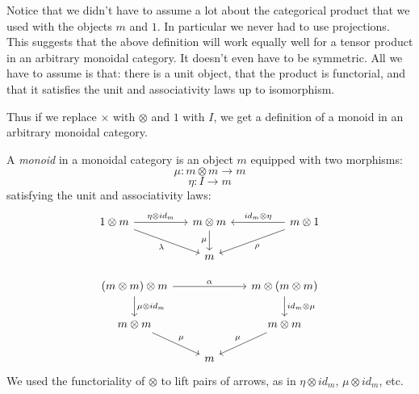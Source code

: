 \documentclass[DaoFP]{subfiles}
\begin{document}
Notice that we didn't have to assume a lot about the categorical product that we used with the objects $m$ and $1$. In particular we never had to use projections. This suggests that the above definition will work equally well for a tensor product in an arbitrary monoidal category. It doesn't even have to be symmetric. All we have to assume is that: there is a unit object, that the product is functorial, and that it satisfies the unit and associativity laws up to isomorphism.

Thus if we replace $\times$ with $\otimes$ and $1$ with $I$, we get a definition of a monoid in an arbitrary monoidal category. 

A \emph{monoid} in a monoidal category is an object $m$ equipped with two morphisms:
\[ \mu \colon m \otimes m \to m \]
\[ \eta \colon I \to m \]
satisfying the unit and associativity laws:
\[
 \begin{tikzcd}
 1 \otimes m
 \arrow[rr, "\eta \otimes id_m"]
 \arrow[rrd, "\lambda"']
& & m \otimes m
 \arrow[d, "\mu"']
&& m \otimes 1
 \arrow[ll, "id_m \otimes \eta"']
 \arrow[lld, "\rho"]
 \\
 && m
  \end{tikzcd}
\]

\[
 \begin{tikzcd}
 (m \otimes m) \otimes m 
 \arrow[rr, "\alpha"]
 \arrow[d, "\mu \otimes id_m"]
 &&
 m \otimes (m \otimes m)
 \arrow[d, "id_m \otimes \mu"]
 \\
 m \otimes m 
 \arrow[dr, "\mu"]
& & m \otimes m
 \arrow[dl, "\mu"']
 \\
&  m
 \end{tikzcd}
\]
We used the functoriality of $\otimes$ to lift pairs of arrows, as in $\eta \otimes id_m$, $\mu \otimes id_m$, etc.
\end{document}
